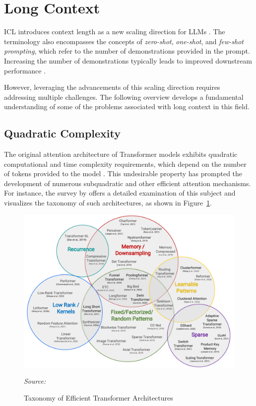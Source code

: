 \section{Long Context}

ICL introduces context length as a new scaling direction for LLMs \parencite{kaplan2020}. The terminology also encompasses the concepts of \textit{zero-shot}, \textit{one-shot}, and \textit{few-shot prompting}, which refer to the number of demonstrations provided in the prompt. Increasing the number of demonstrations typically leads to improved downstream performance \parencite{brown2020}.

However, leveraging the advancements of this scaling direction requires addressing multiple challenges. The following overview develops a fundamental understanding of some of the problems associated with long context in this field.

\subsection{Quadratic Complexity}  %

The original attention architecture of Transformer models exhibits quadratic computational and time complexity requirements, which depend on the number of tokens provided to the model \parencite{vaswani2017}. This undesirable property has prompted the development of numerous subquadratic and other efficient attention mechanisms. For instance, the survey by \citet{tay2022} offers a detailed examination of this subject and visualizes the taxonomy of such architectures, as shown in Figure~\ref{fig:taxonomy-of-transformers}.

\begin{figure}[ht]
    \centering
    \includegraphics[width=\textwidth]{figures/taxonomy-of-transformers.pdf}
    \caption{Taxonomy of Efficient Transformer Architectures}\label{fig:taxonomy-of-transformers}
    \hfill\textit{Source: \citet{tay2022}}
\end{figure}



